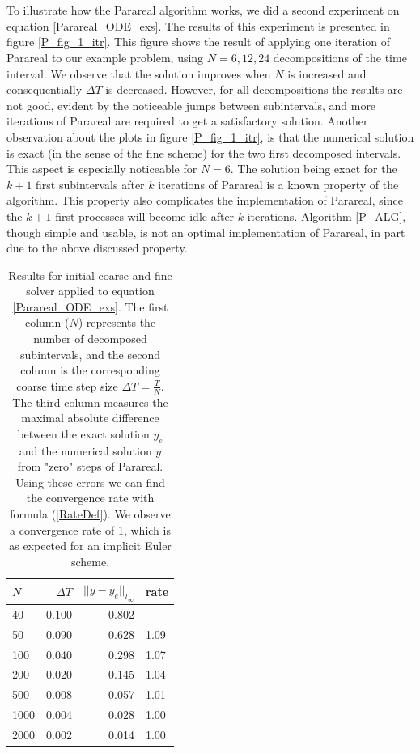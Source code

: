 \\
\\
To illustrate how the Parareal algorithm works, we did a second experiment on equation \ref{Parareal_ODE_exs}. The results of this experiment is presented in figure \ref{P_fig_1_itr}. This figure shows the result of applying one iteration of Parareal to our example problem, using $N=6,12,24$ decompositions of the time interval. We observe that the solution improves when $N$ is increased and consequentially $\Delta T$ is decreased. However, for all decompositions the results are not good, evident by the noticeable jumps between subintervals, and more iterations of Parareal are required to get a satisfactory solution. Another observation about the plots in figure \ref{P_fig_1_itr}, is that the numerical solution is exact (in the sense of the fine scheme) for the two first decomposed intervals. This aspect is especially noticeable for $N=6$. The solution being exact for the $k+1$ first subintervals after $k$ iterations of Parareal is a known property of the algorithm. This property also complicates the implementation of Parareal, since the $k+1$ first processes will become idle after $k$ iterations. Algorithm \ref{P_ALG}, though simple and usable, is not an optimal implementation of Parareal, in part due to the above discussed property.
\\
\begin{table}[h]
\centering
\caption{Results for initial coarse and fine solver applied to equation \ref{Parareal_ODE_exs}. The first column ($N$) represents the number of decomposed subintervals, and the second column is the corresponding coarse time step size $\Delta T=\frac{T}{N}$. The third column measures the maximal absolute difference between the exact solution $y_e$ and the numerical solution $y$ from "zero" steps of Parareal. Using these errors we can find the convergence rate with formula (\ref{RateDef}). We observe a convergence rate of 1, which is as expected for an implicit Euler scheme.}
\label{par_con1}
\begin{tabular}{lrrl}
\toprule
{}$N$ &      $\Delta T$ &       $||y-y_e||_{l_{\infty}}$ &  rate \\
\midrule
40   &  0.100 &  0.802 &       -- \\
50   &  0.090 &  0.628 &  1.09 \\
100  &  0.040 &  0.298 &  1.07 \\
200  &  0.020 &  0.145 &  1.04 \\
500  &  0.008 &  0.057 &  1.01 \\
1000 &  0.004 &  0.028 &  1.00 \\
2000 &  0.002 &  0.014 &  1.00 \\
\bottomrule
\end{tabular}
\end{table}
